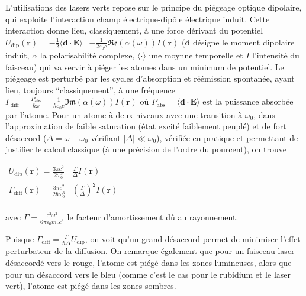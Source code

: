 \documentclass[11pt,a4paper] { article}
\newcommand{\e}[1]{\text{e}^{#1}}
\newcommand{\mathsc}[1]{\mathrm{\scriptscriptstyle {#1}}}
\renewcommand{\v}[1]{\mathbf{#1}}
\newenvironment{salign}{
\centering
  $ \displaystyle
    \begin{aligned} 
}
{
    \end{aligned}  $ 
\par
}
\begin{document}
L'utilisations des lasers verts repose sur le principe du piégeage optique dipolaire, qui exploite l'interaction champ électrique-dipôle électrique induit. 
Cette interaction donne lieu, classiquement, à une force dérivant du potentiel $U_\mathsc{dip}(\v r) = -\frac12 \langle \v d \cdot \v E \rangle$=$-\frac{1}{2\varepsilon_0 c}\mathfrak{Re}\left(\alpha(\omega)\right) I(\v r)$ ($\v d$ désigne le moment dipolaire induit, $\alpha$ la polarisabilité complexe, $\langle \cdot \rangle$ une moynne temporelle et $I$ l'intensité du faisceau)
qui va servir à piéger les atomes dans un minimum de potentiel. Le piégeage est perturbé par les cycles d'absorption et réémission spontanée, ayant lieu, toujours ``classiquement'', à une fréquence $\Gamma_\mathsc{diff} = \frac{P_\mathsc{abs}}{\hbar \omega} = \frac{1}{\hbar \varepsilon_0 c} \mathfrak{Im}\left(\alpha(\omega)\right) I(\v r)$ où $P_\mathsc{abs} = \langle \dot{\v d} \cdot \v E \rangle$ est la puissance absorbée par l'atome. 
Pour un atome à deux niveaux avec une transition à $\omega_0$, dans l'approximation de faible saturation (état excité faiblement peuplé) et de fort désaccord ($\Delta = \omega - \omega_0$ vérifiant $|\Delta| \ll \omega_0$), vérifiée en pratique et permettant de justifier le calcul classique (à une précision de l'ordre du pourcent), on trouve

\begin{salign}
	U_\mathsc{dip}(\v r)=\frac{3\pi c^2}{2\omega_0^3} & \frac{\Gamma}{\Delta} I(\v r) \\
	\Gamma_\mathsc{diff}(\v r)=\frac{3\pi c^2}{2\hbar\omega_0^3} & \left(\frac{\Gamma}{\Delta}\right)^2 I(\v r) \\
\end{salign}

avec $\Gamma = \frac{\e 2 \omega^2}{6 \pi \varepsilon_0 m_e c^3}$ le facteur d'amortissement dû au rayonnement.

Puisque $\Gamma_\mathsc{diff}=\frac{\Gamma}{\hbar \Delta} U_\mathsc{dip}$, on voit qu'un grand désaccord permet de minimiser l'effet perturbateur de la diffusion. On remarque également que pour un faisceau laser désaccordé vers le rouge, l'atome est piégé dans les zones lumineuses, alors que pour un désaccord vers le bleu (comme c'est le cas pour le rubidium et le laser vert), l'atome est piégé dans les zones sombres.
\end{document}
